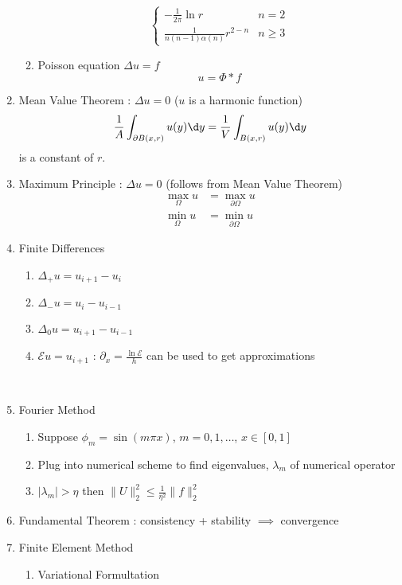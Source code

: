 \documentclass[10pt]{extarticle}
\begin{document}
\begin{multicols}{2}
\begin{enumerate}
\begin{enumerate}
\begin{equation*}
\begin{cases}
				-\frac{1}{2\pi}\ln{r} & n = 2 \\
				\frac{1}{n(n-1)\alpha(n)}r^{2-n} & n \geq 3
			\end{cases}
		\end{equation*}
		\item Poisson equation $\Delta u = f$
		\begin{equation*}
			u = \Phi * f
		\end{equation*}
	\end{enumerate}
	\item Mean Value Theorem : $\Delta u = 0$ ($u$ is a harmonic function)
	\begin{equation*}
		\frac{1}{A}\int_{\partial B(x,r)}u(y)\d y = \frac{1}{V}\int_{B(x,r)}u(y)\d y
	\end{equation*}
	is a constant of $r$.
	\item Maximum Principle : $\Delta u = 0$ (follows from Mean Value Theorem)
	\begin{align*}
		\max_{\Omega}u &= \max_{\partial\Omega}u \\
		\min_{\Omega}u &= \min_{\partial\Omega}u
	\end{align*}
	\item Finite Differences
	\begin{enumerate}
		\item $\Delta_+ u = u_{i+1} - u_i$
		\item $\Delta_- u = u_i - u_{i-1}$
		\item $\Delta_0 u = u_{i+1} - u_{i-1}$
		\item $\mathcal{E}u = u_{i+1}$ : $\partial_x = \frac{\ln\mathcal{E}}{h}$ can be used to get approximations
	\end{enumerate}\
	\item Fourier Method
	\begin{enumerate}
		\item Suppose $\phi_m = \sin(m\pi x)$, $m = 0,1,\dots$, $x \in [0,1]$
		\item Plug into numerical scheme to find eigenvalues, $\lambda_m$ of numerical operator
		\item $\left|\lambda_m\right| > \eta$ then $\|U\|_2^2 \leq \frac{1}{\eta^2}\|f\|_2^2$
	\end{enumerate}
	\item Fundamental Theorem : consistency + stability $\implies$ convergence
	\item Finite Element Method
	\begin{enumerate}
		\item Variational Formultation

\end{enumerate}
\end{enumerate}
\end{multicols}
\end{document}
